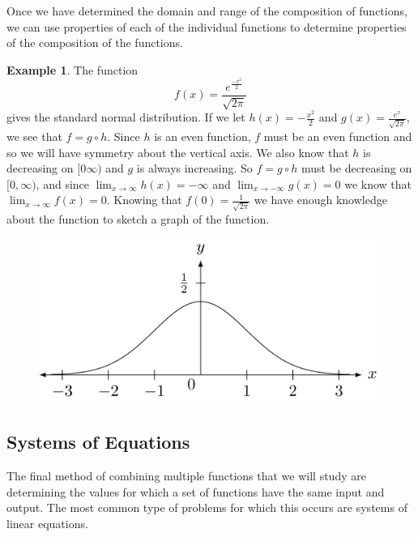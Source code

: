 \documentclass[
]{book}
\theoremstyle{definition}
\theoremstyle{definition}
\newtheorem{example}{Example}[chapter]
\theoremstyle{definition}
\theoremstyle{remark}
\begin{document}
Once we have determined the domain and range of the composition of functions, we can use properties of each of the individual functions to determine properties of the composition of the functions.

\begin{example}
\protect\hypertarget{exm:unnamed-chunk-258}{}{\label{exm:unnamed-chunk-258} }The function
\[f(x) = \frac{e^{\frac{-x^2}{2}}}{\sqrt{2\pi}}\] gives the standard normal distribution. If we let \(h(x)=-\frac{x^2}{2}\) and \(g(x)=\frac{e^x}{\sqrt{2\pi}}\), we see that \(f=g\circ h\). Since \(h\) is an even function, \(f\) must be an even function and so we will have symmetry about the vertical axis. We also know that \(h\) is decreasing on \([0\infty)\) and \(g\) is always increasing. So \(f=g\circ h\) must be decreasing on \([0,\infty)\), and since \(\lim_{x\rightarrow \infty} h(x) = -\infty\) and \(\lim_{x\rightarrow -\infty} g(x) = 0\) we know that \(\lim_{x\rightarrow \infty} f(x) = 0\). Knowing that \(f(0)=\frac{1}{\sqrt{2\pi}}\) we have enough knowledge about the function to sketch a graph of the function.
\end{example}

\begin{figure}

{\centering \includegraphics[width=0.5\linewidth]{tikz/normal-distribution} 

}

\end{figure}

\hypertarget{systems-of-equations}{%
\subsection{Systems of Equations}\label{systems-of-equations}}

The final method of combining multiple functions that we will study are determining the values for which a set of functions have the same input and output. The most common type of problems for which this occurs are systems of linear equations.
\end{document}
